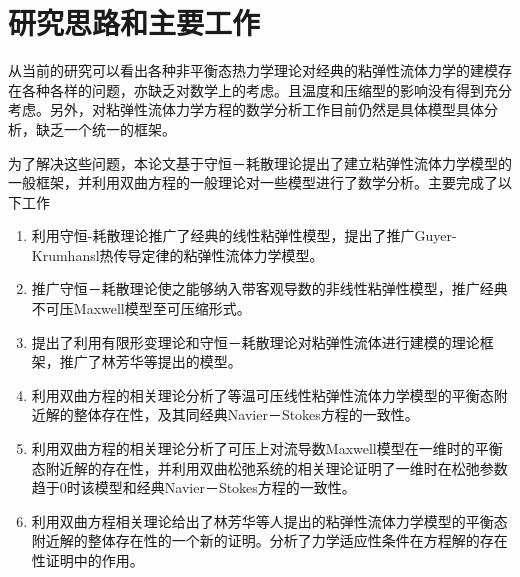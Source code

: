 \section{研究思路和主要工作}
从当前的研究可以看出各种非平衡态热力学理论对经典的粘弹性流体力学的建模存在各种各样的问题，亦缺乏对数学上的考虑。且温度和压缩型的影响没有得到充分考虑。另外，对粘弹性流体力学方程的数学分析工作目前仍然是具体模型具体分析，缺乏一个统一的框架。

为了解决这些问题，本论文基于守恒－耗散理论提出了建立粘弹性流体力学模型的一般框架，并利用双曲方程的一般理论对一些模型进行了数学分析。主要完成了以下工作
\begin{enumerate}
\item 利用守恒-耗散理论推广了经典的线性粘弹性模型，提出了推广Guyer-Krumhansl热传导定律的粘弹性流体力学模型。
\item 推广守恒－耗散理论使之能够纳入带客观导数的非线性粘弹性模型，推广经典不可压Maxwell模型至可压缩形式。
\item 提出了利用有限形变理论和守恒－耗散理论对粘弹性流体进行建模的理论框架，推广了林芳华等提出的模型。
\item 利用双曲方程的相关理论分析了等温可压线性粘弹性流体力学模型的平衡态附近解的整体存在性，及其同经典Navier－Stokes方程的一致性。
\item 利用双曲方程的相关理论分析了可压上对流导数Maxwell模型在一维时的平衡态附近解的存在性，并利用双曲松弛系统的相关理论证明了一维时在松弛参数趋于$0$时该模型和经典Navier－Stokes方程的一致性。
\item 利用双曲方程相关理论给出了林芳华等人提出的粘弹性流体力学模型的平衡态附近解的整体存在性的一个新的证明。分析了力学适应性条件在方程解的存在性证明中的作用。
\end{enumerate}

